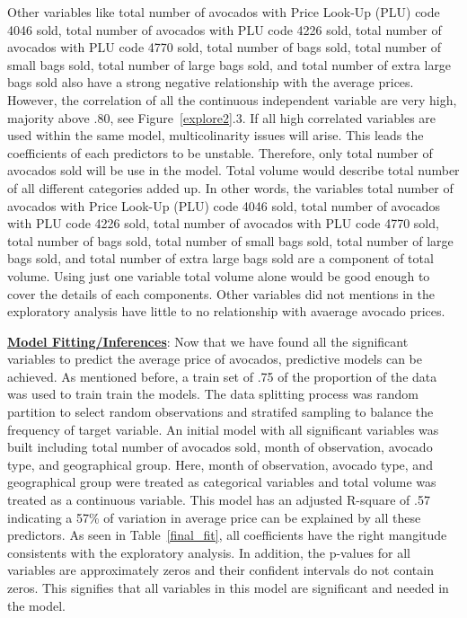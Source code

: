 \documentclass[11pt]{article}\usepackage[]{graphicx}\usepackage[]{color}
\begin{document}
Other variables like total number of avocados with Price Look-Up (PLU) code 4046 sold, total number of avocados with PLU code 4226 sold, total number of avocados with PLU code 4770 sold, total number of bags sold, total number of small bags sold, total number of large bags sold, and total number of extra large bags sold also have a strong negative relationship with the average prices. However, the correlation of all the continuous independent variable are very high, majority above .80, see Figure~\ref{explore2}.3. If all high correlated variables are used within the same model, multicolinarity issues will arise. This leads the coefficients of each predictors to be unstable. Therefore, only total number of avocados sold will be use in the model. Total volume would describe total number of all different categories added up. In other words, the variables total number of avocados with Price Look-Up (PLU) code 4046 sold, total number of avocados with PLU code 4226 sold, total number of avocados with PLU code 4770 sold, total number of bags sold, total number of small bags sold, total number of large bags sold, and total number of extra large bags sold are a component of total volume. Using just one variable total volume alone would be good enough to cover the details of each components. Other variables did not mentions in the exploratory analysis have little to no relationship with avaerage avocado prices.  
\hfill \break




\noindent\textbf{\underline{Model Fitting/Inferences}}: Now that we have found all the significant variables to predict the average price of avocados, predictive models can be achieved. As mentioned before, a train set of .75 of the proportion of the data was used to train train the models. The data splitting process was random partition to select random observations and stratifed sampling to balance the frequency of target variable. An initial model with all significant variables was built including total number of avocados sold, month of observation, avocado type, and geographical group. Here, month of observation, avocado type, and geographical group were treated as categorical variables and total volume was treated as a continuous variable. This model has an adjusted R-square of .57 indicating a 57\% of variation in average price can be explained by all these predictors. As seen in Table~\ref{final_fit}, all coefficients have the right mangitude consistents with the exploratory analysis. In addition, the p-values for all variables are approximately zeros and their confident intervals do not contain zeros. This signifies that all variables in this model are significant and needed in the model.    
\end{document}
